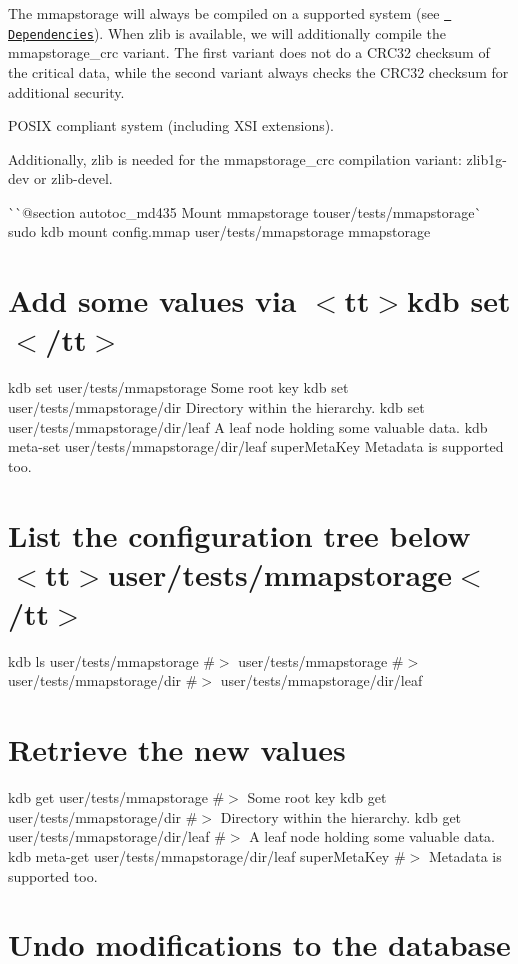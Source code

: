 The {\ttfamily mmapstorage} will always be compiled on a supported system (see \href{\#dependencies}{\texttt{ Dependencies}}). When zlib is available, we will additionally compile the {\ttfamily mmapstorage\+\_\+crc} variant. The first variant does not do a C\+R\+C32 checksum of the critical data, while the second variant always checks the C\+R\+C32 checksum for additional security.

P\+O\+S\+IX compliant system (including X\+SI extensions).

Additionally, zlib is needed for the {\ttfamily mmapstorage\+\_\+crc} compilation variant\+: {\ttfamily zlib1g-\/dev} or {\ttfamily zlib-\/devel}.

\`{}\`{}{\ttfamily  @section autotoc\+\_\+md435 Mount mmapstorage to}user/tests/mmapstorage\`{} sudo kdb mount config.\+mmap user/tests/mmapstorage mmapstorage\hypertarget{autotoc_md429_autotoc_md436}{}\section{Add some values via $<$tt$>$kdb set$<$/tt$>$}\label{autotoc_md429_autotoc_md436}
kdb set user/tests/mmapstorage \textquotesingle{}Some root key\textquotesingle{} kdb set user/tests/mmapstorage/dir \textquotesingle{}Directory within the hierarchy.\textquotesingle{} kdb set user/tests/mmapstorage/dir/leaf \textquotesingle{}A leaf node holding some valuable data.\textquotesingle{} kdb meta-\/set user/tests/mmapstorage/dir/leaf super\+Meta\+Key \textquotesingle{}Metadata is supported too.\textquotesingle{}\hypertarget{autotoc_md429_autotoc_md437}{}\section{List the configuration tree below $<$tt$>$user/tests/mmapstorage$<$/tt$>$}\label{autotoc_md429_autotoc_md437}
kdb ls user/tests/mmapstorage \#$>$ user/tests/mmapstorage \#$>$ user/tests/mmapstorage/dir \#$>$ user/tests/mmapstorage/dir/leaf\hypertarget{autotoc_md429_autotoc_md438}{}\section{Retrieve the new values}\label{autotoc_md429_autotoc_md438}
kdb get user/tests/mmapstorage \#$>$ Some root key kdb get user/tests/mmapstorage/dir \#$>$ Directory within the hierarchy. kdb get user/tests/mmapstorage/dir/leaf \#$>$ A leaf node holding some valuable data. kdb meta-\/get user/tests/mmapstorage/dir/leaf super\+Meta\+Key \#$>$ Metadata is supported too.\hypertarget{autotoc_md429_autotoc_md439}{}\section{Undo modifications to the database}\label{autotoc_md429_autotoc_md439}
